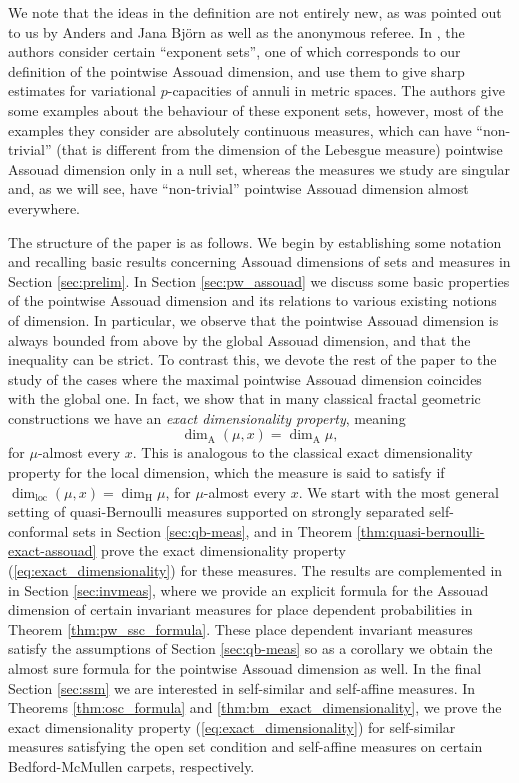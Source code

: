\documentclass{PRM}
\newcommand{\adim}{\dim_{\mathrm{A}}}
\theoremstyle{plain}
\theoremstyle{definition}
\theoremstyle{remark}
\begin{document}
We note that the ideas in the definition are not entirely new, as was pointed out to us by Anders and Jana Björn as well as the anonymous referee. In \cite{BBL}, the authors consider certain ``exponent sets'', one of which corresponds to our definition of the pointwise Assouad dimension, and use them to give sharp estimates for variational $p$-capacities of annuli in metric spaces. The authors give some examples about the behaviour of these exponent sets, however, most of the examples they consider are absolutely continuous measures, which can have ``non-trivial'' (that is different from the dimension of the Lebesgue measure) pointwise Assouad dimension only in a null set, whereas the measures we study are singular and, as we will see, have ``non-trivial'' pointwise Assouad dimension almost everywhere.

The structure of the paper is as follows. We begin by establishing some notation and recalling basic results concerning Assouad dimensions of sets and measures in Section \ref{sec:prelim}. In Section \ref{sec:pw_assouad} we discuss some basic properties of the pointwise Assouad dimension and its relations to various existing notions of dimension. In particular, we observe that the pointwise Assouad dimension is always bounded from above by the global Assouad dimension, and that the inequality can be strict. To contrast this, we devote the rest of the paper to the study of the cases where the maximal pointwise Assouad dimension coincides with the global one.
In fact, we show that in many classical fractal geometric constructions we have an \emph{exact dimensionality property}, meaning
\begin{equation}\label{eq:exact_dimensionality}
    \adim(\mu,x)= \adim\mu,
\end{equation}
for $\mu$-almost every $x$. This is analogous to the classical exact dimensionality property for the local dimension, which the measure is said to satisfy if $\dim_{\mathrm{loc}}(\mu,x)=\dim_{\mathrm{H}}\mu$, for $\mu$-almost every $x$.  We start with the most general setting of quasi-Bernoulli measures supported on strongly separated self-conformal sets in Section \ref{sec:qb-meas},  and in Theorem \ref{thm:quasi-bernoulli-exact-assouad} prove the exact dimensionality property (\ref{eq:exact_dimensionality}) for these measures. The results are complemented in in Section \ref{sec:invmeas}, where we provide an explicit formula for the Assouad dimension of certain invariant measures for place dependent probabilities in Theorem \ref{thm:pw_ssc_formula}. These place dependent invariant measures satisfy the assumptions of Section \ref{sec:qb-meas} so as a corollary we obtain the almost sure formula for the pointwise Assouad dimension as well. In the final Section \ref{sec:ssm} we are interested in self-similar and self-affine measures. In Theorems \ref{thm:osc_formula} and \ref{thm:bm_exact_dimensionality}, we prove the exact dimensionality property (\ref{eq:exact_dimensionality}) for self-similar measures satisfying the open set condition and self-affine measures on certain Bedford-McMullen carpets, respectively.
\end{document}
